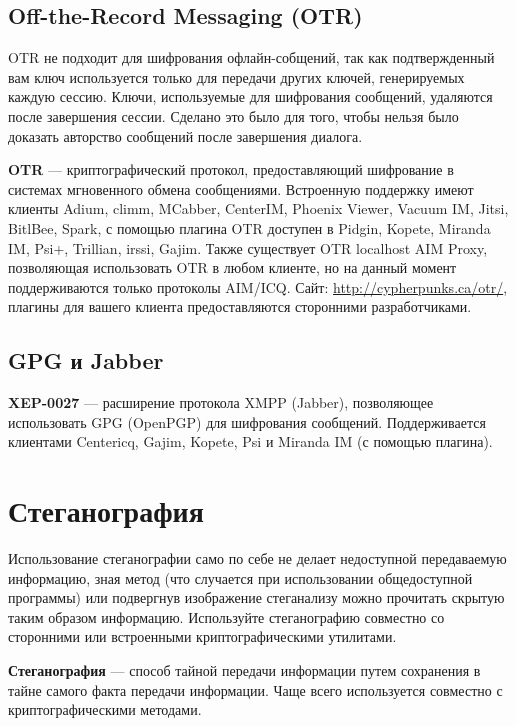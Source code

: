 \begin{enumerate}
\subsection{Off-the-Record Messaging (OTR)}
\begin{important}
OTR не подходит для шифрования офлайн-собщений, так как подтвержденный вам ключ используется только для передачи других ключей, генерируемых каждую сессию. Ключи, используемые для шифрования сообщений, удаляются после завершения сессии. Сделано это было для того, чтобы нельзя было доказать авторство сообщений после завершения диалога.
\end{important}
\textbf{OTR} --- криптографический протокол, предоставляющий шифрование в системах мгновенного обмена сообщениями. Встроенную поддержку имеют клиенты Adium, climm, MCabber, CenterIM, Phoenix Viewer, Vacuum IM, Jitsi, BitlBee, Spark, с помощью плагина OTR доступен в Pidgin\cite{otr-pidgin}, Kopete\cite{otr-kopete}, Miranda IM\cite{otr-miranda}, Psi+\cite{otr-psi}, Trillian\cite{otr-trillian}, irssi\cite{otr-irssi}, Gajim\cite{otr-gajim}. Также существует OTR localhost AIM Proxy, позволяющая использовать OTR в любом клиенте, но на данный момент поддерживаются только протоколы AIM/ICQ. Сайт: \url{http://cypherpunks.ca/otr/}, плагины для вашего клиента предоставляются сторонними разработчиками.
\subsection{GPG и Jabber}
\textbf{XEP-0027} --- расширение протокола XMPP (Jabber), позволяющее использовать GPG (OpenPGP) для шифрования сообщений\cite{xep-0027}. Поддерживается клиентами Centericq, Gajim, Kopete, Psi и Miranda IM (с помощью плагина).

\section{Стеганография}
\begin{important}
Использование стеганографии само по себе не делает недоступной передаваемую информацию, зная метод (что случается при использовании общедоступной программы) или подвергнув изображение стеганализу можно прочитать скрытую таким образом информацию. Используйте стеганографию совместно со сторонними или встроенными криптографическими утилитами.
\end{important}
\textbf{Стеганография} --- способ тайной передачи информации путем сохранения в тайне самого факта передачи информации. Чаще всего используется совместно с криптографическими методами.

\end{enumerate}
